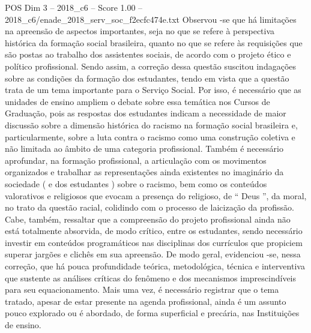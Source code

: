 \begin{textsample}{POS Dim 3 – 2018\_c6 – Score 1.00 – 2018\_c6/enade\_2018\_serv\_soc\_f2ecfc474e.txt}
Observou -se que há limitações na apreensão de aspectos importantes, seja no que se refere à perspectiva histórica da formação social brasileira, quanto no que se refere às requisições que são postas ao trabalho dos assistentes sociais, de acordo com o projeto ético e político profissional.
Sendo assim, a correção dessa questão suscitou indagações sobre as condições da formação dos estudantes, tendo em vista que a questão trata de um tema importante para o Serviço Social.
Por isso, é necessário que as unidades de ensino ampliem o debate sobre essa temática nos Cursos de Graduação, pois as respostas dos estudantes indicam a necessidade de maior discussão sobre a dimensão histórica do racismo na formação social brasileira e, particularmente, sobre a luta contra o racismo como uma construção coletiva e não limitada ao âmbito de uma categoria profissional.
Também é necessário aprofundar, na formação profissional, a articulação com os movimentos organizados e trabalhar as representações ainda existentes no imaginário da sociedade ( e dos estudantes ) sobre o racismo, bem como os conteúdos valorativos e religiosos que evocam a presença do religioso, de “ Deus ”, da moral, no trato da questão racial, colidindo com o processo de laicização da profissão.
Cabe, também, ressaltar que a compreensão do projeto profissional ainda não está totalmente absorvida, de modo crítico, entre os estudantes, sendo necessário investir em conteúdos programáticos nas disciplinas dos currículos que propiciem superar jargões e clichês em sua apreensão.
De modo geral, evidenciou -se, nessa correção, que há pouca profundidade teórica, metodológica, técnica e interventiva que sustente as análises críticas do fenômeno e dos mecanismos imprescindíveis para seu equacionamento.
Mais uma vez, é necessário registrar que o tema tratado, apesar de estar presente na agenda profissional, ainda é um assunto pouco explorado ou é abordado, de forma superficial e precária, nas Instituições de ensino.

\end{textsample}
